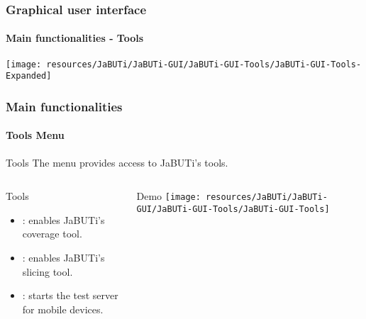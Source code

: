 \begin{frame}[parent={cmap:jabuti-gui},hasnext=true,hasprev=true]
\frametitle{Graphical user interface}
\framesubtitle{Main functionalities - Tools}
\label{concept:main-functionalities:tools}

\vfill
\texttt{[image: resources/JaBUTi/JaBUTi-GUI/JaBUTi-GUI-Tools/JaBUTi-GUI-Tools-Expanded]}
\vfill
\end{frame}


\begin{frame}
\frametitle{Main functionalities}
\framesubtitle{Tools Menu}
\label{concept:tools-menu}
\label{concept:coverage-tool}
\label{concept:slicing-tool}
\label{concept:start-test-server}

\begin{block}{Tools}
The  menu provides access to JaBUTi's tools.
\end{block}

\begin{columns}[t]
\begin{block}{Tools}
\begin{itemize}
	\item {}: enables JaBUTi's coverage tool.
	\item {}: enables JaBUTi's slicing tool.
	\item {}: starts the test server for mobile
	devices.
\end{itemize}
\end{block}
\begin{block}{Demo}
	\texttt{[image: resources/JaBUTi/JaBUTi-GUI/JaBUTi-GUI-Tools/JaBUTi-GUI-Tools]}
\end{block}
\end{columns}

\end{frame}